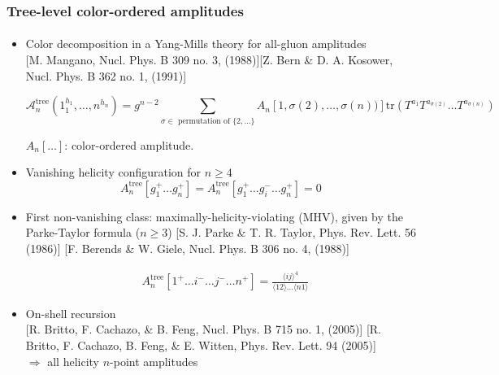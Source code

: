 \documentclass[english]{beamer}
\newcommand{\tr}{\mathrm{tr}}
\begin{document}
\begin{frame}[shrink=30]
\frametitle{Tree-level color-ordered amplitudes}
\framesubtitle{}
\begin{itemize}
\item<1-> Color decomposition in a Yang-Mills theory for all-gluon amplitudes
\\
\tiny\color{blue}[M. Mangano, Nucl. Phys. B 309
no. 3, (1988)][Z. Bern \& D. A. Kosower, Nucl. Phys. B 362 no. 1, (1991)]\color{black}\normalsize

\small
\begin{equation*}
\mathcal{A}_n^{\mathrm{tree}}(1^{h_1}_1, \ldots, n^{h_n}) = g^{n-2}\sum_{\sigma\in\textrm{ permutation of }\{2,\ldots\}} A_n[1,\sigma(2),\ldots,\sigma(n))]\tr(T^{a_1} T^{a_{\sigma(2)}}\ldots T^{a_{\sigma(n)}})
\end{equation*}
\normalsize

$A_n[\ldots]$: color-ordered amplitude. 


\item<2-> Vanishing helicity configuration for $n\geq 4$
\begin{equation*}
A^{\mathrm{tree}}_n[g_1^+ \ldots g_n^+] = A^{\mathrm{tree}}_n[g_1^+ \ldots g_i^- \ldots g_n^+] = 0
\end{equation*}

\item<3-> First non-vanishing class: maximally-helicity-violating (MHV), given by the Parke-Taylor formula ($n\geq 3$)
\tiny\color{blue}[S. J. Parke \& T. R. Taylor, Phys. Rev. Lett.
56 (1986)]
[F. Berends \& W. Giele, Nucl. Phys. B 306 no. 4, (1988)]
\color{black}\normalsize


\begin{equation*}
\begin{split}
& A^{\mathrm{tree}}_n[1^+\ldots i^-\ldots j^-\ldots n^+] = 
\frac{\langle ij \rangle^4}{\langle 12 \rangle\ldots \langle n1 \rangle}
\end{split}
\end{equation*}

\item<4-> On-shell recursion 
\\
\tiny\color{blue}
[R. Britto, F. Cachazo, \& B. Feng, Nucl. Phys. B 715 no. 1, (2005)] 
[R. Britto, F. Cachazo, B. Feng, \& E. Witten, Phys. Rev. Lett. 94
(2005)]\color{black}\normalsize
\\
 $\Rightarrow$ all helicity $n$-point amplitudes

\end{itemize}
\end{frame}
\end{document}

